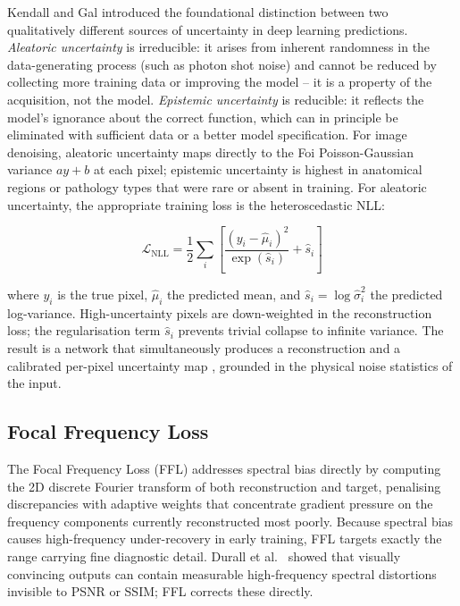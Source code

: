 \documentclass[12pt, a4paper, twoside, openright]{book}
\begin{document}
Kendall and Gal \cite{kendall_what_2017} introduced the foundational distinction between two qualitatively different sources of uncertainty in deep learning predictions. \emph{Aleatoric uncertainty} is irreducible: it arises from inherent randomness in the data-generating process (such as photon shot noise) and cannot be reduced by collecting more training data or improving the model -- it is a property of the acquisition, not the model. \emph{Epistemic uncertainty} is reducible: it reflects the model's ignorance about the correct function, which can in principle be eliminated with sufficient data or a better model specification. For image denoising, aleatoric uncertainty maps directly to the Foi Poisson-Gaussian variance $ay+b$ at each pixel; epistemic uncertainty is highest in anatomical regions or pathology types that were rare or absent in training. For aleatoric uncertainty, the appropriate training loss is the heteroscedastic NLL:

\begin{equation}
\label{eq:lit:nll}
\mathcal{L}_\mathrm{NLL} = \frac{1}{2} \sum_i \left[
  \frac{(y_i - \hat{\mu}_i)^2}{\exp(\hat{s}_i)} + \hat{s}_i
\right]
\end{equation}

where $y_i$ is the true pixel, $\hat{\mu}_i$ the predicted mean, and $\hat{s}_i = \log\hat{\sigma}^2_i$ the predicted log-variance. High-uncertainty pixels are down-weighted in the reconstruction loss; the regularisation term $\hat{s}_i$ prevents trivial collapse to infinite variance. The result is a network that simultaneously produces a reconstruction and a calibrated per-pixel uncertainty map \cite{kendall_what_2017}, grounded in the physical noise statistics of the input.

\subsection{Focal Frequency Loss}
\label{sec:lit:losses:ffl}

The Focal Frequency Loss (FFL) \cite{jiang_focal_2021} addresses spectral bias directly by computing the 2D discrete Fourier transform of both reconstruction and target, penalising discrepancies with adaptive weights that concentrate gradient pressure on the frequency components currently reconstructed most poorly. Because spectral bias causes high-frequency under-recovery in early training, FFL targets exactly the range carrying fine diagnostic detail. Durall et al.\ \cite{durall_watch_2020} showed that visually convincing outputs can contain measurable high-frequency spectral distortions invisible to PSNR or SSIM; FFL corrects these directly.
\end{document}
